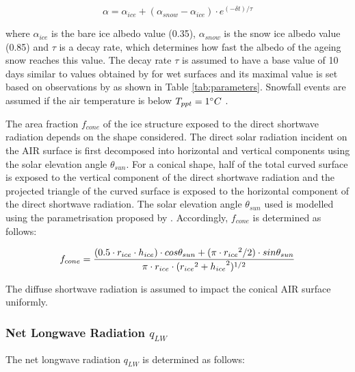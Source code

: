 \documentclass[utf8]{frontiersSCNS} %
\begin{document}
\begin{equation} \alpha=\alpha_{ice}+(\alpha_{snow}-\alpha_{ice}) \cdot e^{(-\delta t)/\tau} \label{eqn:a}
\end{equation}

where $\alpha_{ice}$ is the bare ice albedo value (0.35), $\alpha_{snow}$ is the snow ice albedo value (0.85) and $\tau$
is a decay rate, which determines how fast the albedo of the ageing snow reaches this value.  The decay rate $\tau$ is
assumed to have a base value of 10 days similar to values obtained by \cite{Schmidt_2017} for wet surfaces and its
maximal value is set based on observations by \cite{OerlemansKnap_1998} as shown in Table \ref{tab:parameters}. Snowfall
events are assumed if the air temperature is below $T_{ppt}=1 \degree C$ \citep{FujitaAgeta_2000}.  

The area fraction $f_{cone}$ of the ice structure exposed to the direct shortwave radiation depends on the shape
considered. The direct solar radiation incident on the AIR surface is first decomposed into horizontal and vertical
components using the solar elevation angle $\theta_{sun}$. For a conical shape, half of the total curved surface is
exposed to the vertical component of the direct shortwave radiation and the projected triangle of the curved surface is
exposed to the horizontal component of the direct shortwave radiation. The solar elevation angle $\theta_{sun}$ used is
modelled using the parametrisation proposed by \cite{Woolf_1968}. Accordingly, $f_{cone}$ is determined as follows:

\begin{equation} \begin{split} f_{cone}& =\frac{(0.5 \cdot r_{ice} \cdot h_{ice}) \cdot cos \theta_{sun} +(\pi \cdot
{r_{ice}}^2/2) \cdot sin \theta_{sun} }{\pi \cdot r_{ice} \cdot ({r_{ice}}^2+{h_{ice}}^2)^{1/2}}\\ \end{split}
\label{eqn:f_{cone}} \end{equation}

The diffuse shortwave radiation is assumed to impact the conical AIR surface uniformly. 

\subsubsection{Net Longwave Radiation \texorpdfstring{$q_{LW}$}{Lg}}

The net longwave radiation $q_{LW}$ is determined as follows:
\end{document}
